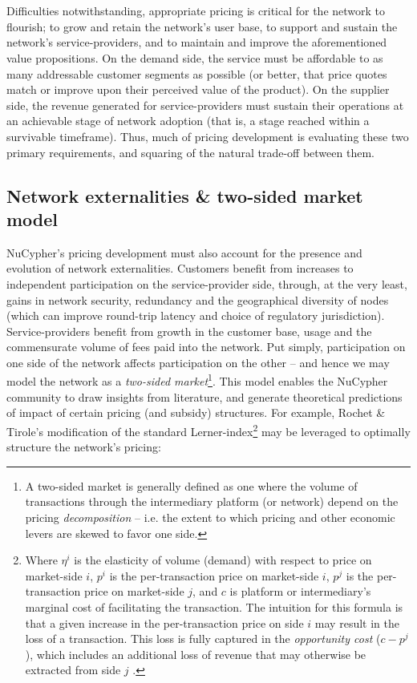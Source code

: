 \documentclass[longbibliography,nofootinbib]{revtex4-1}
\begin{document}
\\\\
Difficulties notwithstanding, appropriate pricing is critical for the network to flourish; to grow and retain the network’s user base, to support and sustain the network’s service-providers, and to maintain and improve the aforementioned value propositions. On the demand side, the service must be affordable to as many addressable customer segments as possible (or better, that price quotes match or improve upon their perceived value of the product). On the supplier side, the revenue generated for service-providers must sustain their operations at an achievable stage of network adoption (that is, a stage reached within a survivable timeframe). Thus, much of pricing development is evaluating these two primary requirements, and squaring of the natural trade-off between them.

\subsection{Network externalities \& two-sided market model}

NuCypher’s pricing development must also account for the presence and evolution of network externalities. Customers benefit from increases to independent participation on the service-provider side, through, at the very least, gains in network security, redundancy and the geographical diversity of nodes (which can improve round-trip latency and choice of regulatory jurisdiction). Service-providers benefit from growth in the customer base, usage and the commensurate volume of fees paid into the network. Put simply, participation on one side of the network affects participation on the other – and hence we may model the network as a \textit{two-sided market}\footnote{A two-sided market is generally defined as one where the volume of transactions through the intermediary platform (or network) depend on the pricing \textit{decomposition} – i.e. the extent to which pricing and other economic levers are skewed to favor one side.}. This model enables the NuCypher community to draw insights from literature, and generate theoretical predictions of impact of certain pricing (and subsidy) structures. For example, Rochet \& Tirole's modification of the standard Lerner-index\footnote{Where $\eta^i$ is the elasticity of volume (demand) with respect to price on market-side $i$, $p^i$ is the per-transaction price on market-side $i$, $p^j$ is the per-transaction price on market-side $j$, and $c$ is platform or intermediary's marginal cost of facilitating the transaction. The intuition for this formula is that a given increase in the per-transaction price on side $i$ may result in the loss of a transaction. This loss is fully captured in the \textit{opportunity cost} ($c - p^j$), which includes an additional loss of revenue that may otherwise be extracted from side $j$ \cite{RTprogress}.} may be leveraged to optimally structure the network's pricing: \\
\end{document}
